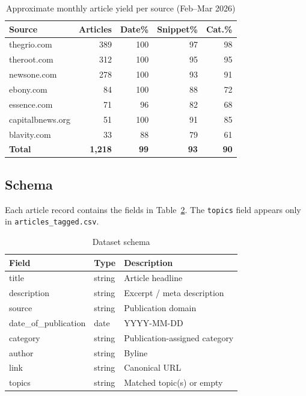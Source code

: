 \documentclass[sigconf,anonymous]{acmart}
\begin{document}
\begin{table}[h]
\caption{Approximate monthly article yield per source (Feb--Mar 2026)}
\label{tab:coverage}
\small
\begin{tabular}{lrrrr}
\toprule
\textbf{Source} & \textbf{Articles} & \textbf{Date\%} & \textbf{Snippet\%} & \textbf{Cat.\%} \\
\midrule
thegrio.com      & 389 & 100 & 97 & 98 \\
theroot.com      & 312 & 100 & 95 & 95 \\
newsone.com      & 278 & 100 & 93 & 91 \\
ebony.com        &  84 & 100 & 88 & 72 \\
essence.com      &  71 &  96 & 82 & 68 \\
capitalbnews.org &  51 & 100 & 91 & 85 \\
blavity.com      &  33 &  88 & 79 & 61 \\
\midrule
\textbf{Total}   & \textbf{1,218} & \textbf{99} & \textbf{93} & \textbf{90} \\
\bottomrule
\end{tabular}
\end{table}

\subsection{Schema}

Each article record contains the fields in Table~\ref{tab:schema}.
The \texttt{topics} field appears only in \texttt{articles\_tagged.csv}.

\begin{table}[h]
\caption{Dataset schema}
\label{tab:schema}
\small
\begin{tabular}{lll}
\toprule
\textbf{Field} & \textbf{Type} & \textbf{Description} \\
\midrule
title               & string & Article headline \\
description         & string & Excerpt / meta description \\
source              & string & Publication domain \\
date\_of\_publication & date   & YYYY-MM-DD \\
category            & string & Publication-assigned category \\
author              & string & Byline \\
link                & string & Canonical URL \\
topics              & string & Matched topic(s) or empty \\
\bottomrule
\end{tabular}
\end{table}
\end{document}
